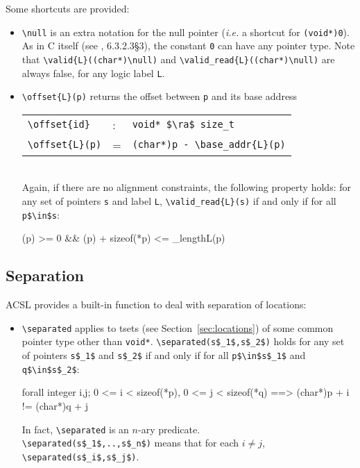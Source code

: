 Some shortcuts are provided:
\begin{itemize}
\item \lstinline|\null| is an
  extra notation for the
  null pointer (\emph{i.e.} a shortcut for \lstinline|(void*)0|). 
  As in C itself (see \cite{standardc99}, 6.3.2.3\S3),
  the constant \lstinline|0| can have any pointer type. Note that 
  \lstinline|\valid{L}((char*)\null)| and \lstinline|\valid_read{L}((char*)\null)|
  are always false, for any
  logic label \lstinline|L|.
\item \lstinline|\offset{L}(p)|%
  returns the offset between \lstinline|p| and its base address
\\ \makebox[5mm]{} \begin{tabular}{lll}
    \lstinline|\offset{id}| &:& \lstinline|void* $\ra$ size_t| \\
    \lstinline|\offset{L}(p)| &=& \lstinline|(char*)p - \base_addr{L}(p)| \\
  \end{tabular} \\
Again, if there are no alignment constraints,
  the following property holds: for any set of pointers
\lstinline|s| and label \lstinline|L|, \lstinline|\valid_read{L}(s)| if and only if for all \lstinline|p$\in$s|:
  \begin{listing-nonumber}
    (p) >= 0 && (p) + sizeof(*p) <= \block_length{L}(p)
  \end{listing-nonumber}

\end{itemize}

\subsection{Separation}\label{sec:separated} 

ACSL provides a built-in function to deal with separation of locations:

\begin{itemize}
\item \lstinline|\separated|
applies to tsets (see Section~\ref{sec:locations}) of some common pointer type
other than \lstinline|void*|. 
\lstinline|\separated(s$_1$,s$_2$)|
holds for any set of pointers \lstinline|s$_1$| and \lstinline|s$_2$| 
if and only if for all \lstinline|p$\in$s$_1$| and \lstinline|q$\in$s$_2$|:
\begin{listing-nonumber}
  forall integer i,j; 0 <= i < sizeof(*p), 0 <= j < sizeof(*q)
     ==>  (char*)p + i != (char*)q + j 
\end{listing-nonumber}

In fact, \lstinline|\separated| is an $n$-ary predicate.\\
\lstinline|\separated(s$_1$,..,s$_n$)| means
that for each
$i\neq j$, \lstinline|\separated(s$_i$,s$_j$)|.
\end{itemize}


